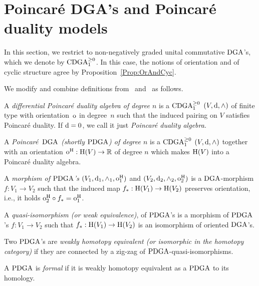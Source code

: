 \documentclass[\MainFolder/Text.tex]{subfiles}
\begin{document}
\section{Poincar\'e DGA's and Poincar\'e duality models}\label{SubSec:PoincModel}



In this section, we restrict to non-negatively graded unital commutative $\mathrm{DGA}$'s, which we denote by $\mathrm{CDGA}_{1}^{\ge 0}$. In this case, the notions of orientation and of cyclic structure agree by Proposition~\ref{Prop:OrAndCyc}.

We modify and combine definitions from~\cite{Van2019} and~\cite{Lambrechts2007} as follows.

\begin{Definition}\label{Def:PDGA}
A \emph{differential Poincar\'e duality algebra of degree $n$} is a $\mathrm{CDGA}_{1}^{\ge 0}$ $(V,\mathrm{d},\wedge)$ of finite type with orientation~$\mathrm{o}$ in degree~$n$ such that the induced pairing on $V$ satisfies Poincar\'e duality. If $\mathrm{d} = 0$, we call it just \emph{Poincar\'e duality algebra.}

A \emph{Poincar\'e~$\mathrm{DGA}$ (shortly $\mathrm{PDGA}$) of degree $n$} is a $\mathrm{CDGA}_{1}^{\ge 0}$ $(V,\mathrm{d},\wedge)$ together with an orientation $\mathrm{o}^{\mathrm{H}}: \mathrm{H}(V) \rightarrow \mathbb{R}$  of degree $n$ which makes $\mathrm{H}(V)$ into a Poincar\'e duality algebra.

A \emph{morphism of $\mathrm{PDGA}$'s} $(V_1,\mathrm{d}_1,\wedge_1,\mathrm{o}^{\mathrm{H}}_1)$ and $(V_2,\mathrm{d}_2,\wedge_2,\mathrm{o}^{\mathrm{H}}_2)$ is a $\mathrm{DGA}$-morphism $f: V_1 \rightarrow V_2$ such that the induced map $f_*: \mathrm{H}(V_1) \rightarrow \mathrm{H}(V_2)$ preserves orientation, i.e., it holds $\mathrm{o}_2^{\mathrm{H}} \circ f_* = \mathrm{o}_1^{\mathrm{H}}$.

A \emph{quasi-isomorphism (or weak equivalence)}, of $\mathrm{PDGA}$'s is a morphism of $\mathrm{PDGA}$'s $f: V_1 \rightarrow V_2$ such that $f_*: \mathrm{H}(V_1) \rightarrow \mathrm{H}(V_2)$ is an isomorphism of oriented $\mathrm{DGA}$'s.

Two $\mathrm{PDGA}$'s are \emph{weakly homotopy equivalent (or isomorphic in the homotopy category)} if they are connected by a zig-zag of $\mathrm{PDGA}$-quasi-isomorphisms.

A $\mathrm{PDGA}$ is \emph{formal} if it is weakly homotopy equivalent as a $\mathrm{PDGA}$ to its homology.
\end{Definition}
\end{document}
